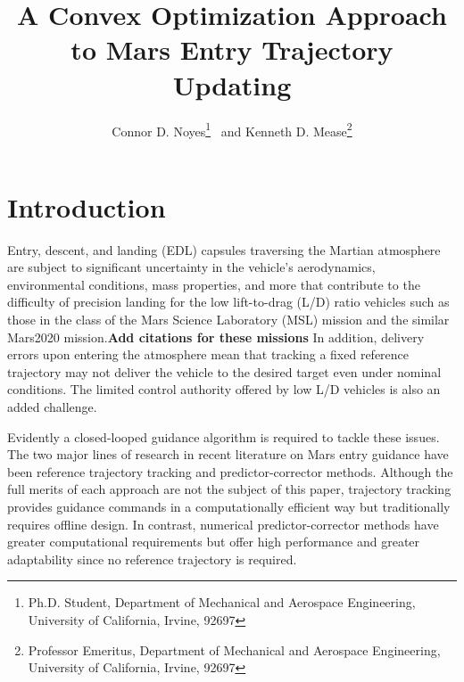 \documentclass[letterpaper, preprint, paper,11pt]{AAS}	%
\begin{document}
\author{Connor D. Noyes\thanks{Ph.D. Student, Department of Mechanical and Aerospace Engineering, University of California, Irvine, 92697} \ and Kenneth D. Mease\thanks{Professor Emeritus, Department of Mechanical and Aerospace Engineering, University of California, Irvine, 92697}} %
\title{A Convex Optimization Approach to Mars Entry Trajectory Updating}
\maketitle
	
	\begin{abstract}
	
	

	\end{abstract}
	
	\section{Introduction}
	Entry, descent, and landing (EDL) capsules traversing the Martian atmosphere are subject to significant uncertainty in the vehicle's aerodynamics, environmental conditions, mass properties, and more that contribute to the difficulty of precision landing for the low lift-to-drag (L/D) ratio vehicles such as those in the class of the Mars Science Laboratory (MSL) mission and the similar Mars2020 mission.\textbf{Add citations for these missions} 
	In addition, delivery errors upon entering the atmosphere mean that tracking a fixed reference trajectory may not deliver the vehicle to the desired target even under nominal conditions. The limited control authority offered by low L/D vehicles is also an added challenge.

	Evidently a closed-looped guidance algorithm is required to tackle these issues. The two major lines of research in recent literature on Mars entry guidance have been reference trajectory tracking and predictor-corrector methods. 
	Although the full merits of each approach are not the subject of this paper, trajectory tracking provides guidance commands in a computationally efficient way but traditionally requires offline design. In contrast, numerical predictor-corrector methods have greater computational requirements but offer high performance and greater adaptability since no reference trajectory is required. 
	
\end{document}

